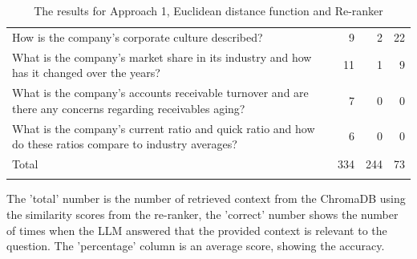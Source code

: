 \begin{longtable}{L{0.6\textwidth}rrr}
How is the company's corporate culture described? & 9 & 2 & 22 \\
What is the company's market share in its industry and how has it changed over the years? & 11 & 1 & 9 \\
What is the company's accounts receivable turnover and are there any concerns regarding receivables aging? & 7 & 0 & 0 \\
What is the company's current ratio and quick ratio and how do these ratios compare to industry averages? & 6 & 0 & 0 \\
\hline
Total & 334 & 244 & 73 \\
\hline
\caption{The results for Approach 1, Euclidean distance function and Re-ranker} \\
\end{longtable}

The 'total' number is the number of retrieved context from the ChromaDB using the similarity scores from the re-ranker, the 'correct' number shows the number of times when the LLM answered that the provided context is relevant to the question. The 'percentage' column is an average score, showing the accuracy.


